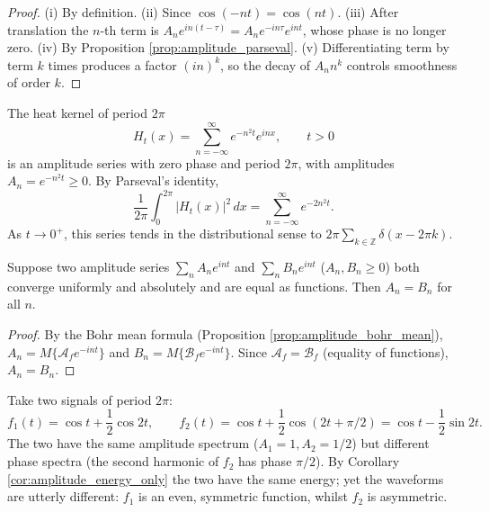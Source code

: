 \begin{proof}
(i) By definition. (ii) Since $\cos(-nt)=\cos(nt)$. (iii) After translation the $n$-th term is $A_n e^{in(t-\tau)}=A_n e^{-in\tau}e^{int}$, whose phase is no longer zero. (iv) By Proposition \ref{prop:amplitude_parseval}. (v) Differentiating term by term $k$ times produces a factor $(in)^k$, so the decay of $A_n n^k$ controls smoothness of order $k$.
\end{proof}

\begin{example}\label{ex:amplitude_heat_kernel}
The heat kernel of period $2\pi$
\[
H_t(x)=\sum_{n=-\infty}^{\infty} e^{-n^2 t} e^{inx}, \qquad t>0
\]
is an amplitude series with zero phase and period $2\pi$, with amplitudes $A_n=e^{-n^2 t}\ge 0$. By Parseval's identity,
\[
\frac{1}{2\pi}\int_0^{2\pi}|H_t(x)|^2\,dx
= \sum_{n=-\infty}^{\infty} e^{-2n^2 t}.
\]
As $t\to 0^+$, this series tends in the distributional sense to $2\pi\sum_{k\in\mathbb{Z}}\delta(x-2\pi k)$.
\end{example}

\begin{proposition}\label{prop:amplitude_series_uniqueness}
Suppose two amplitude series $\sum_n A_n e^{int}$ and $\sum_n B_n e^{int}$ ($A_n, B_n \ge 0$) both converge uniformly and absolutely and are equal as functions. Then $A_n = B_n$ for all $n$.
\end{proposition}

\begin{proof}
By the Bohr mean formula (Proposition \ref{prop:amplitude_bohr_mean}), $A_n = M\{\mathcal{A}_f e^{-int}\}$ and $B_n = M\{\mathcal{B}_f e^{-int}\}$. Since $\mathcal{A}_f = \mathcal{B}_f$ (equality of functions), $A_n = B_n$.
\end{proof}

\begin{example}\label{ex:same_amplitude_diff_phase}
Take two signals of period $2\pi$:
\[
f_1(t) = \cos t + \frac{1}{2}\cos 2t, \qquad f_2(t) = \cos t + \frac{1}{2}\cos(2t + \pi/2) = \cos t - \frac{1}{2}\sin 2t.
\]
The two have the same amplitude spectrum ($A_1 = 1, A_2 = 1/2$) but different phase spectra (the second harmonic of $f_2$ has phase $\pi/2$). By Corollary \ref{cor:amplitude_energy_only} the two have the same energy; yet the waveforms are utterly different: $f_1$ is an even, symmetric function, whilst $f_2$ is asymmetric.
\end{example}

